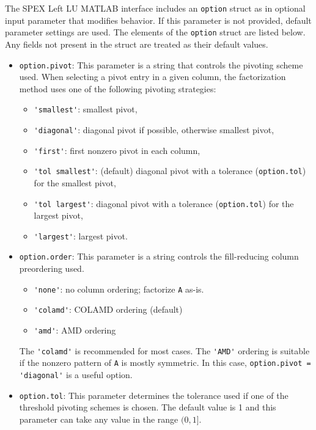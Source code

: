 \documentclass[12pt]{report}
\theoremstyle{definition}
\begin{document}
The SPEX Left LU MATLAB interface includes an \verb|option| struct as in optional
input parameter that modifies behavior.  If this parameter is not provided,
default parameter settings are used.  The elements of the \verb'option' struct
are listed below.  Any fields not present in the struct are treated as their
default values.

\begin{itemize}

\item \verb|option.pivot|: This parameter is a string that controls the
pivoting scheme used.  When selecting a pivot entry in a given column, the
factorization method uses one of the following pivoting strategies:

    \begin{itemize}
    \item \verb|'smallest'|: smallest pivot,
    \item \verb|'diagonal'|: diagonal pivot if possible, otherwise smallest pivot,
    \item \verb|'first'|: first nonzero pivot in each column,
    \item \verb|'tol smallest'|: (default) diagonal pivot with a tolerance (\verb|option.tol|)
        for the smallest pivot,
    \item \verb|'tol largest'|: diagonal pivot with a tolerance (\verb|option.tol|)
        for the largest pivot,
    \item \verb|'largest'|: largest pivot.
    \end{itemize}
    
\item \verb|option.order|: This parameter is a string controls the
fill-reducing column preordering used.

    \begin{itemize}
    \item \verb|'none'|: no column ordering; factorize \verb'A' as-is.
    \item \verb|'colamd'|: COLAMD ordering (default)
    \item \verb|'amd'|: AMD ordering
    \end{itemize}

The \verb|'colamd'| is recommended for most cases.  The \verb|'AMD'| ordering
is suitable if the nonzero pattern of \verb'A' is mostly symmetric.  In this
case, \verb|option.pivot = 'diagonal'| is a useful option.

\item \verb|option.tol|: This parameter determines the tolerance used if one of
the threshold pivoting schemes is chosen. The default value is 1 and this
parameter can take any value in the range $(0,1]$.


\end{itemize}
\end{document}
